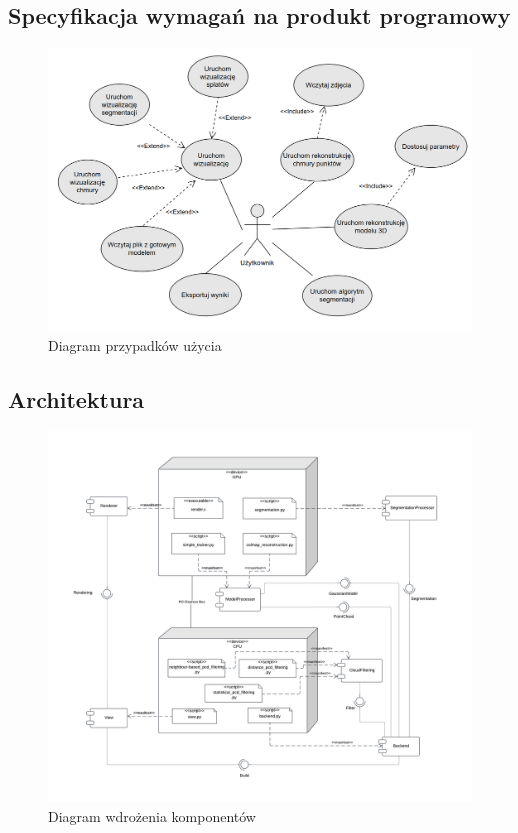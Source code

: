 \subsection{Specyfikacja wymagań na produkt programowy}

\begin{figure}[!htb]
    \includegraphics[width=1.0\linewidth]{img/diagramy/diagram_pu_3.png}
    \caption{Diagram przypadków użycia}\label{fig:use_case_diagram}
  \end{figure}

\subsection{Architektura}

\begin{figure}[!htb]
    \includegraphics[width=1.0\linewidth]{img/diagramy/diagram_wdrozenia_komponentow_3.png}
    \caption{Diagram wdrożenia komponentów}\label{fig:components_diagram}
\end{figure}


